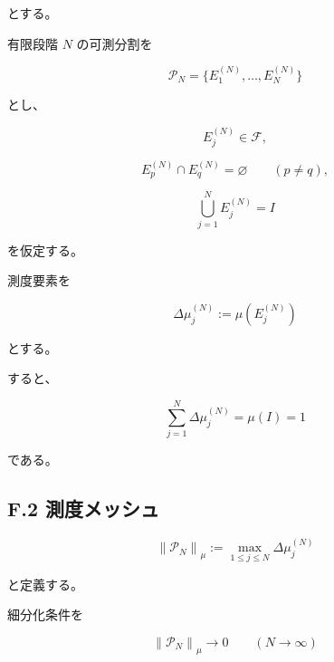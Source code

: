 \documentclass[a4paper,11pt]{article}
\begin{document}
とする。

有限段階 $N$ の可測分割を

\begin{equation}
    \mathcal{P}_N
    =
    \{E_1^{(N)},\ldots,E_N^{(N)}\}
\end{equation}

とし、

\begin{equation}
    E_j^{(N)}\in\mathcal{F},
\end{equation}

\begin{equation}
    E_p^{(N)}
    \cap
    E_q^{(N)}
    =
    \varnothing
    \qquad(p\neq q),
\end{equation}

\begin{equation}
    \bigcup_{j=1}^{N}E_j^{(N)}
    =
    I
\end{equation}

を仮定する。

測度要素を

\begin{equation}
    \Delta\mu_j^{(N)}
    :=
    \mu(E_j^{(N)})
\end{equation}

とする。

すると、

\begin{equation}
    \sum_{j=1}^{N}
    \Delta\mu_j^{(N)}
    =
    \mu(I)
    =
    1
\end{equation}

である。


\subsection{F.2 測度メッシュ}

\begin{equation}
    \left\|\mathcal{P}_N\right\|_\mu
    :=
    \max_{1\leq j\leq N}
    \Delta\mu_j^{(N)}
\end{equation}

と定義する。

細分化条件を

\begin{equation}
    \boxed{
        \left\|\mathcal{P}_N\right\|_\mu
        \longrightarrow0
        \qquad(N\to\infty)
    }
\end{equation}
\end{document}
